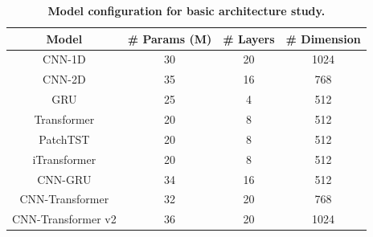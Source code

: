 \setlength{\tabcolsep}{1pt}   %
\renewcommand{\arraystretch}{1.0} %
\setlength{\heavyrulewidth}{1pt}   %
\setlength{\lightrulewidth}{0.5pt} %

\begin{table}[htbp]
\centering
\small %
\caption{\textbf{Model configuration for basic architecture study.}}
\label{tab:Table.5}
\begin{tabular}{@{}cccc@{}} %
\toprule
\textbf{Model} & \textbf{\# Params (M)} & \textbf{\# Layers} & \textbf{\# Dimension} \\
\midrule
CNN-1D         & 30  & 20 & 1024 \\
CNN-2D         & 35  & 16 & 768  \\
GRU            & 25  & 4  & 512  \\
Transformer    & 20  & 8  & 512  \\
PatchTST       & 20  & 8  & 512  \\
iTransformer   & 20  & 8  & 512  \\
CNN-GRU        & 34  & 16 & 512  \\
CNN-Transformer & 32 & 20 & 768  \\
CNN-Transformer v2 & 36 & 20 & 1024 \\
\bottomrule
\end{tabular}
\end{table}